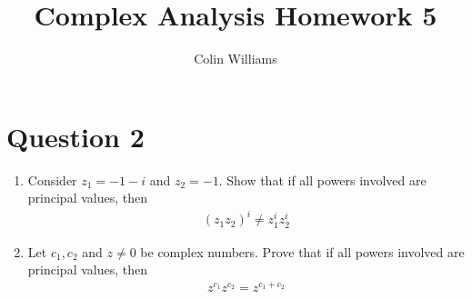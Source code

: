 \documentclass[10pt,a4paper]{article}
\title{Complex Analysis Homework 5}
\author{Colin Williams}
\theoremstyle{definition}
\begin{document}
\maketitle

\section*{Question 2}
\begin{enumerate}[label = (\alph*)]
\item Consider $z_1 = -1-i$ and $z_2 = -1$. Show that if all powers involved are principal values, then 
\begin{align*}
(z_1z_2)^i \neq z_1^iz_2^i
\end{align*}
\item Let $c_1, c_2$ and $z \neq 0$ be complex numbers. Prove that if all powers involved are principal values, then
\begin{align*}
z^{c_1}z^{c_2} = z^{c_1 + c_2}
\end{align*}
\end{enumerate}
\end{document}
